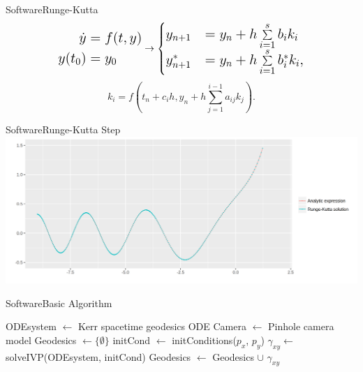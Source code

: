 \begin{frame}{Software}{Runge-Kutta}
	\[
	\Large
	\begin{split}
		\dot{y} &= f(t,y) \\
		y(t_0) &= y_0
	\end{split}
	\rightarrow
	\begin{cases}
		y_{n+1} &= y_n + h \sum\limits_{i=1}^s b_i k_i\\
		y^*_{n+1} &= y_n + h \sum\limits_{i=1}^s b^*_i k_i,
	\end{cases}
	\]
	\vspace{2mm}
	\[
		k_i = f(t_n + c_ih, y_n + h\sum_{j=1}^{i-1} a_{ij} k_j).
	\]
\end{frame}

\begin{frame}{Software}{Runge-Kutta Step}
	\centering
	\includegraphics[width=0.8\paperwidth]{gfx/analytic}
\end{frame}

\begin{frame}{Software}{Basic Algorithm}
{
	\tiny
	\begin{algorithm}[H]
		\begin{algorithmic}[1]
			\State ODEsystem $\gets$ Kerr spacetime geodesics ODE
			\State Camera $\gets$ Pinhole camera model
			\State Geodesics $\gets \{\emptyset\}$
			\State initCond $\gets$ initConditions($p_x$, $p_y$)
			\State $\gamma_{xy} \gets$ solveIVP(ODEsystem, initCond)
			\State Geodesics $\gets$ Geodesics $\cup$ $\gamma_{xy}$
			\EndFor
			\EndFunction
		\end{algorithmic}
	\end{algorithm}
}
\end{frame}

